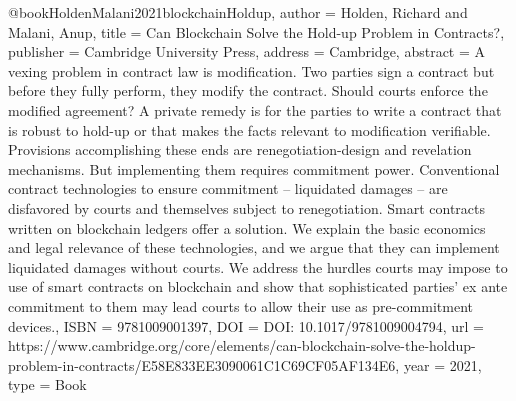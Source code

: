 {{{{@book{HoldenMalani2021blockchainHoldup,
   author = {Holden, Richard and Malani, Anup},
   title = {Can Blockchain Solve the Hold-up Problem in Contracts?},
   publisher = {Cambridge University Press},
   address = {Cambridge},
   abstract = {A vexing problem in contract law is modification. Two parties sign a contract but before they fully perform, they modify the contract. Should courts enforce the modified agreement? A private remedy is for the parties to write a contract that is robust to hold-up or that makes the facts relevant to modification verifiable. Provisions accomplishing these ends are renegotiation-design and revelation mechanisms. But implementing them requires commitment power. Conventional contract technologies to ensure commitment – liquidated damages – are disfavored by courts and themselves subject to renegotiation. Smart contracts written on blockchain ledgers offer a solution. We explain the basic economics and legal relevance of these technologies, and we argue that they can implement liquidated damages without courts. We address the hurdles courts may impose to use of smart contracts on blockchain and show that sophisticated parties' ex ante commitment to them may lead courts to allow their use as pre-commitment devices.},
   ISBN = {9781009001397},
   DOI = {DOI: 10.1017/9781009004794},
   url = {https://www.cambridge.org/core/elements/can-blockchain-solve-the-holdup-problem-in-contracts/E58E833EE3090061C1C69CF05AF134E6},
   year = {2021},
   type = {Book}
}


}}}}

